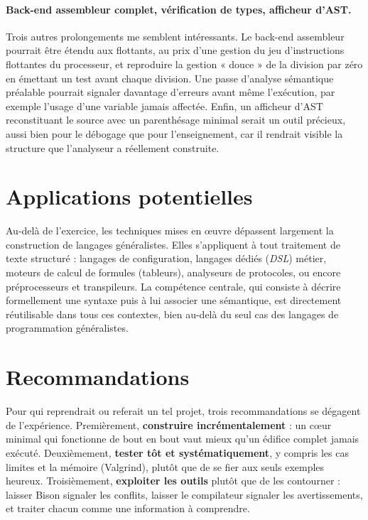 \paragraph{Back-end assembleur complet, vérification de types, afficheur d'AST.}
Trois autres prolongements me semblent intéressants. Le back-end assembleur
pourrait être étendu aux flottants, au prix d'une gestion du jeu d'instructions
flottantes du processeur, et reproduire la gestion « douce » de la division par
zéro en émettant un test avant chaque division. Une passe d'analyse sémantique
préalable pourrait signaler davantage d'erreurs avant même l'exécution, par
exemple l'usage d'une variable jamais affectée. Enfin, un afficheur d'AST
reconstituant le source avec un parenthésage minimal serait un outil précieux,
aussi bien pour le débogage que pour l'enseignement, car il rendrait visible la
structure que l'analyseur a réellement construite.

\section{Applications potentielles}

Au-delà de l'exercice, les techniques mises en \oe uvre dépassent largement la
construction de langages généralistes. Elles s'appliquent à tout traitement de
texte structuré : langages de configuration, langages dédiés (\emph{DSL}) métier,
moteurs de calcul de formules (tableurs), analyseurs de protocoles, ou encore
préprocesseurs et transpileurs. La compétence centrale, qui consiste à décrire
formellement une syntaxe puis à lui associer une sémantique, est directement
réutilisable dans tous ces contextes, bien au-delà du seul cas des langages de
programmation généralistes.

\section{Recommandations}

Pour qui reprendrait ou referait un tel projet, trois recommandations se dégagent
de l'expérience. Premièrement, \textbf{construire incrémentalement} : un c\oe ur
minimal qui fonctionne de bout en bout vaut mieux qu'un édifice complet jamais
exécuté. Deuxièmement, \textbf{tester tôt et systématiquement}, y compris les cas
limites et la mémoire (Valgrind), plutôt que de se fier aux seuls exemples
heureux. Troisièmement, \textbf{exploiter les outils} plutôt que de les
contourner : laisser Bison signaler les conflits, laisser le compilateur signaler
les avertissements, et traiter chacun comme une information à comprendre.

